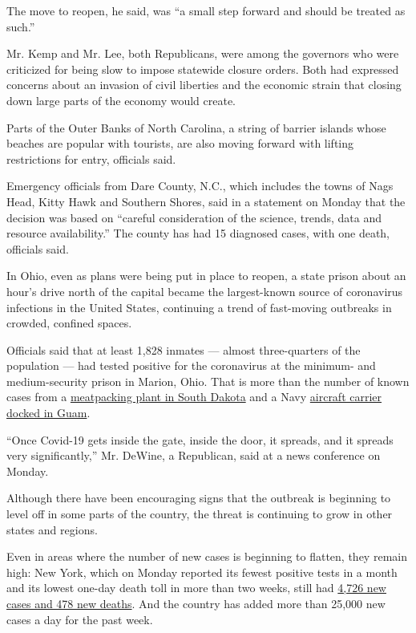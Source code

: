 The move to reopen, he said, was ``a small step forward and should be
treated as such.''

Mr. Kemp and Mr. Lee, both Republicans, were among the governors who
were criticized for being slow to impose statewide closure orders. Both
had expressed concerns about an invasion of civil liberties and the
economic strain that closing down large parts of the economy would
create.

Parts of the Outer Banks of North Carolina, a string of barrier islands
whose beaches are popular with tourists, are also moving forward with
lifting restrictions for entry, officials said.

Emergency officials from Dare County, N.C., which includes the towns of
Nags Head, Kitty Hawk and Southern Shores, said in a statement on Monday
that the decision was based on ``careful consideration of the science,
trends, data and resource availability.'' The county has had 15
diagnosed cases, with one death, officials said.

In Ohio, even as plans were being put in place to reopen, a state prison
about an hour's drive north of the capital became the largest-known
source of coronavirus infections in the United States, continuing a
trend of fast-moving outbreaks in crowded, confined spaces.

Officials said that at least 1,828 inmates --- almost three-quarters of
the population --- had tested positive for the coronavirus at the
minimum- and medium-security prison in Marion, Ohio. That is more than
the number of known cases from a
\href{https://www.nytimes3xbfgragh.onion/2020/04/15/us/coronavirus-south-dakota-meat-plant-refugees.html}{meatpacking
plant in South Dakota} and a Navy
\href{https://www.nytimes3xbfgragh.onion/2020/04/06/us/politics/coronavirus-navy-secretary-roosevelt-crozier.html}{aircraft
carrier docked in Guam}.

``Once Covid-19 gets inside the gate, inside the door, it spreads, and
it spreads very significantly,'' Mr. DeWine, a Republican, said at a
news conference on Monday.

Although there have been encouraging signs that the outbreak is
beginning to level off in some parts of the country, the threat is
continuing to grow in other states and regions.

Even in areas where the number of new cases is beginning to flatten,
they remain high: New York, which on Monday reported its fewest positive
tests in a month and its lowest one-day death toll in more than two
weeks, still had
\href{https://www.nytimes3xbfgragh.onion/2020/04/20/nyregion/coronavirus-new-york-update.html?type=styln-live-updates\&label=new\%20york\&index=2\&action=click\&module=Spotlight\&pgtype=Homepage}{4,726
new cases and 478 new deaths}. And the country has added more than
25,000 new cases a day for the past week.

